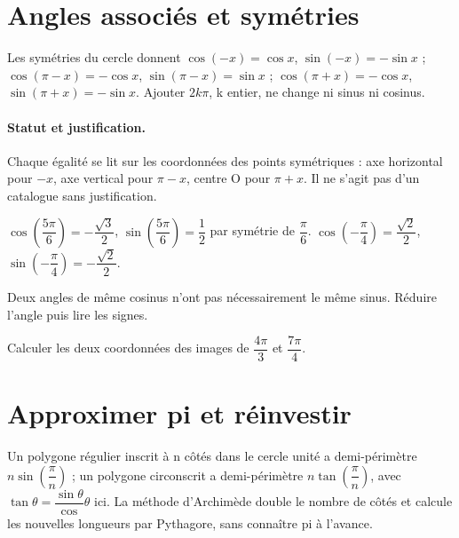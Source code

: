 \section{Angles associés et symétries}\label{C10-U4}
\begin{keypoint}
Les symétries du cercle donnent $\cos(-x)=\cos x$, $\sin(-x)=-\sin x$ ; $\cos(\pi-x)=-\cos x$, $\sin(\pi-x)=\sin x$ ; $\cos(\pi+x)=-\cos x$, $\sin(\pi+x)=-\sin x$. Ajouter $2k\pi$, k entier, ne change ni sinus ni cosinus.
\end{keypoint}
\paragraph{Statut et justification.} Chaque égalité se lit sur les coordonnées des points symétriques : axe horizontal pour $-x$, axe vertical pour $\pi-x$, centre O pour $\pi+x$. Il ne s’agit pas d’un catalogue sans justification.
\begin{example}$\cos (\dfrac{5\pi}{6})=-\dfrac{\sqrt 3}{2}$, $\sin (\dfrac{5\pi}{6})=\dfrac{1}{2}$ par symétrie de $\dfrac{\pi}{6}$. $\cos (-\dfrac{\pi}{4})=\dfrac{\sqrt 2}{2}$, $\sin (-\dfrac{\pi}{4})=-\dfrac{\sqrt 2}{2}$.\end{example}\label{C10-EX4}
\begin{pitfall}Deux angles de même cosinus n’ont pas nécessairement le même sinus. Réduire l’angle puis lire les signes.\end{pitfall}
\begin{application}Calculer les deux coordonnées des images de $\dfrac{4\pi}{3}$ et $\dfrac{7\pi}{4}$.\end{application}\label{C10-AP4}
\section{Approximer pi et réinvestir}\label{C10-U5}
\begin{keypoint}
Un polygone régulier inscrit à n côtés dans le cercle unité a demi-périmètre $n\sin (\dfrac{\pi}{n})$ ; un polygone circonscrit a demi-périmètre $n\tan (\dfrac{\pi}{n})$, avec $\tan \theta =\dfrac{\sin \theta}{\cos}\theta $ ici. La méthode d’Archimède double le nombre de côtés et calcule les nouvelles longueurs par Pythagore, sans connaître pi à l’avance.
\end{keypoint}
